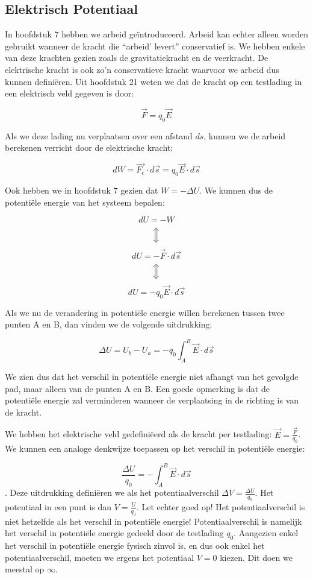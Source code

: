 \documentclass[12pt,a4paper]{article}
\newcommand{\Luda}{\Big\Updownarrow}
\begin{document}
    \subsection{Elektrisch Potentiaal}
    In hoofdstuk 7 hebben we arbeid geïntroduceerd. Arbeid kan echter alleen worden gebruikt wanneer
    de kracht die ``arbeid' levert'' conservatief is. We hebben enkele van deze krachten gezien zoals de
    gravitatiekracht en de veerkracht. De elektrische kracht is ook zo'n conservatieve kracht waarvoor
    we arbeid dus kunnen definiëren. Uit hoofdstuk 21 weten we dat de kracht op een testlading in een
    elektrisch veld gegeven is door: 
    
    $$\vec{F} = q_{0} \vec{E}$$
    
    Als we deze lading nu verplaatsen over een afstand $ds$, kunnen we de arbeid berekenen verricht 
    door de elektrische kracht:
    
    $$dW = \vec{F_{e}} \cdot d\vec{s} = q_{0}\vec{E} \cdot d\vec{s}$$
    
    Ook hebben we in hoofdstuk 7 gezien dat $W = -\Delta U$. We kunnen dus de potentiële energie van
    het systeem bepalen:
    
    $$dU = -W$$
    $$\Luda$$
    $$dU = -\vec{F} \cdot d\vec{s}$$
    $$\Luda$$
    $$dU = -q_{0}\vec{E} \cdot d\vec{s}$$
    
    Als we nu de verandering in potentiële energie willen berekenen tussen twee punten A en B, dan vinden 
    we de volgende uitdrukking:
    
    $$\Delta U = U_{b} - U_{a} = -q_{0} \int_{A}^{B} \vec{E} \cdot d\vec{s}$$
    
    We zien dus dat het verschil in potentiële energie niet afhangt van het gevolgde pad, maar alleen van 
    de punten A en B. Een goede opmerking is dat de potentiële energie zal verminderen wanneer de verplaatsing
    in de richting is van de kracht.
    
    We hebben het elektrische veld gedefiniëerd als de kracht per testlading: $\vec{E} = \frac{\vec{F}}{q_{0}}$. 
    We kunnen een analoge denkwijze toepassen op het verschil in potentiële energie:
    
    $$\frac{\Delta U}{q_{0}} = -\int_{A}^{B} \vec{E} \cdot d\vec{s}$$. Deze uitdrukking definiëren we als het
    potentiaalverschil $\Delta V = \frac{\Delta U}{q_{0}}$. Het potentiaal in een punt is dan $V = \frac{U}{q_{0}}$. Let echter goed op! Het potentiaalverschil
    is niet hetzelfde als het verschil in potentiële energie! Potentiaalverschil is namelijk het verschil in potentiële energie
    gedeeld door de testlading $q_{0}$. Aangezien enkel het verschil in potentiële energie fysisch zinvol is, en dus ook
    enkel het potentiaalverschil, moeten we ergens het potentiaal $V = 0$ kiezen. Dit doen we meestal op $\infty$. 
    
\end{document}
